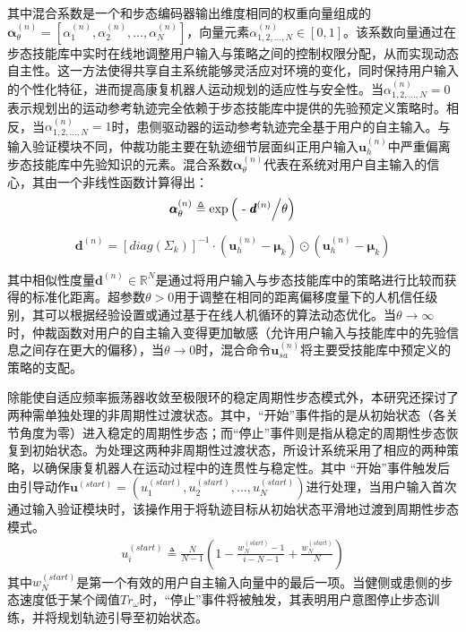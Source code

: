其中混合系数是一个和步态编码器输出维度相同的权重向量组成的${\pmb{\alpha }}_\theta ^{(n)} = [\alpha _1^{(n)},\alpha _2^{(n)},...,\alpha _N^{(n)}]$，向量元素$\alpha _{1,2,...,N}^{(n)} \in [0,1]$。该系数向量通过在步态技能库中实时在线地调整用户输入与策略之间的控制权限分配，从而实现动态自主性。这一方法使得共享自主系统能够灵活应对环境的变化，同时保持用户输入的个性化特征，进而提高康复机器人运动规划的适应性与安全性。当$\alpha _{1,2,...,N}^{(n)} = 0$表示规划出的运动参考轨迹完全依赖于步态技能库中提供的先验预定义策略时。相反，当$\alpha _{1,2,...,N}^{(n)} = 1$时，患侧驱动器的运动参考轨迹完全基于用户的自主输入。与输入验证模块不同，仲裁功能主要在轨迹细节层面纠正用户输入${\pmb{u}}_h^{(n)}$中严重偏离步态技能库中先验知识的元素。混合系数${\pmb{\alpha }}_\theta ^{(n)}$代表在系统对用户自主输入的信心，其由一个非线性函数计算得出：
\begin{equation}
  \label{deqn_ex16}
  {\pmb{\alpha }}_\theta ^{(n)} \triangleq {\text{exp}}\left( {{\text{ - }}{{{\pmb{d}^{(n)}}} \mathord{\left/
 {\vphantom {{{\pmb{d}^{(n)}}} \theta }} \right.
 \kern-\nulldelimiterspace} \theta }} \right)
\end{equation} 

\begin{equation}
  \label{deqn_ex17}
  {\pmb{d}^{(n)}} = {\left[ {diag({{\Sigma _k}})} \right]^{ - 1}} \cdot \left( {\pmb{u}_h^{(n)} - {\pmb{\mu }_k}} \right) \odot \left( {\pmb{u}_h^{(n)} - {\pmb{\mu }_k}} \right)
\end{equation}

其中相似性度量${\pmb{d}^{(n)}} \in {\mathbb{R}^N}$是通过将用户输入与步态技能库中的策略进行比较而获得的标准化距离。超参数$\theta>0$用于调整在相同的距离偏移度量下的人机信任级别，其可以根据经验设置或通过基于在线人机循环的算法动态优化。当$\theta \to \infty$时，仲裁函数对用户的自主输入变得更加敏感（允许用户输入与技能库中的先验信息之间存在更大的偏移），当$\theta \to 0$时，混合命令${\pmb{u}}_{sa}^{(n)}$将主要受技能库中预定义的策略的支配。

除能使自适应频率振荡器收敛至极限环的稳定周期性步态模式外，本研究还探讨了两种需单独处理的非周期性过渡状态。其中，``开始''事件指的是从初始状态（各关节角度为零）进入稳定的周期性步态；而``停止''事件则是指从稳定的周期性步态恢复到初始状态。为处理这两种非周期性过渡状态，所设计系统采用了相应的两种策略，以确保康复机器人在运动过程中的连贯性与稳定性。其中 ``开始''事件触发后由引导动作${\pmb{u}^{(start)}} = ({u}_1^{(start)},{u}_2^{(start)},...,{u}_N^{(start)})$进行处理，当用户输入首次通过输入验证模块时，该操作用于将轨迹目标从初始状态平滑地过渡到周期性步态模式。
\begin{equation}
  \label{deqn_ex18}
  \begin{array}{*{20}{c}}
    {{u}_i^{(start)} \triangleq \frac{N}{{N - 1}}\left( {1 - \frac{{w_N^{(start)} - 1}}{{i - N-1}} + \frac{{w_N^{(start)}}}{N}} \right)} 
  \end{array}
\end{equation} 
其中$w_N^{(start)}$是第一个有效的用户自主输入向量中的最后一项。当健侧或患侧的步态速度低于某个阈值$T{r_\omega }$时，“停止”事件将被触发，其表明用户意图停止步态训练，并将规划轨迹引导至初始状态。

